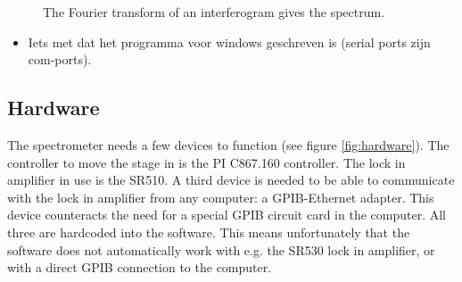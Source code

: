 \begin{figure}
 \begin{center}
  \quad
  \caption{The Fourier transform of an interferogram gives the spectrum.}
  \label{fig:fouriertransform}
 \end{center}
\end{figure}

\begin{itemize}
\item Iets met dat het programma voor windows geschreven is (serial ports zijn com-ports).
\end{itemize}

\subsection{Hardware}

The spectrometer needs a few devices to function (see figure \ref{fig:hardware}). The controller to move the stage in is the PI C867.160 controller. The lock in amplifier in use is the SR510. A third device is needed to be able to communicate with the lock in amplifier from any computer: a GPIB-Ethernet adapter. This device counteracts the need for a special GPIB circuit card in the computer. All three are hardcoded into the software. This means unfortunately that the software does not automatically work with e.g. the SR530 lock in amplifier, or with a direct GPIB connection to the computer.

